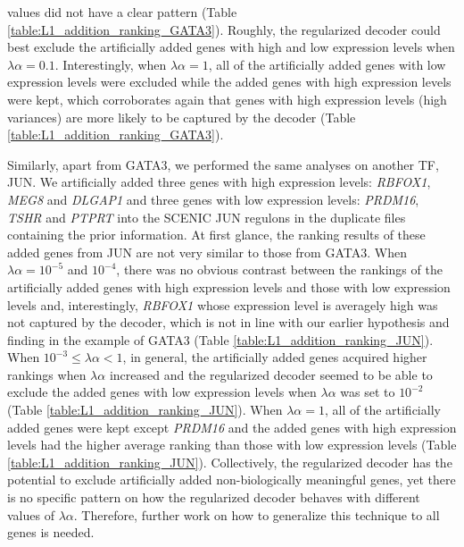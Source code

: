 values did not have a clear pattern (Table \ref{table:L1_addition_ranking_GATA3}). Roughly, the regularized decoder could best exclude the artificially added genes with high and low expression levels when $\lambda\alpha = 0.1$. Interestingly, when $\lambda\alpha = 1$, all of the artificially added genes with low expression levels were excluded while the added genes with high expression levels were kept, which corroborates again that genes with high expression levels (high variances) are more likely to be captured by the decoder (Table \ref{table:L1_addition_ranking_GATA3}).

Similarly, apart from GATA3, we performed the same analyses on another TF, JUN. We artificially added three genes with high expression levels: \textit{RBFOX1}, \textit{MEG8} and \textit{DLGAP1} and three genes with low expression levels: \textit{PRDM16}, \textit{TSHR} and \textit{PTPRT} into the SCENIC JUN regulons in the duplicate files containing the prior information. At first glance, the ranking results of these added genes from JUN are not very similar to those from GATA3. When $\lambda\alpha = 10^{-5}$ and $10^{-4}$, there was no obvious contrast between the rankings of the artificially added genes with high expression levels and those with low expression levels and, interestingly, \textit{RBFOX1} whose expression level is averagely high was not captured by the decoder, which is not in line with our earlier hypothesis and finding in the example of GATA3 (Table \ref{table:L1_addition_ranking_JUN}). When $10^{-3} \leq \lambda\alpha < 1$, in general, the artificially added genes acquired higher rankings when $\lambda\alpha$ increased and the regularized decoder seemed to be able to exclude the added genes with low expression levels when $\lambda\alpha$ was set to $10^{-2}$ (Table \ref{table:L1_addition_ranking_JUN}). When $\lambda\alpha = 1$, all of the artificially added genes were kept except \textit{PRDM16} and the added genes with high expression levels had the higher average ranking than those with low expression levels (Table \ref{table:L1_addition_ranking_JUN}). Collectively, the regularized decoder has the potential to exclude artificially added non-biologically meaningful genes, yet there is no specific pattern on how the regularized decoder behaves with different values of $\lambda\alpha$. Therefore, further work on how to generalize this technique to all genes is needed.

